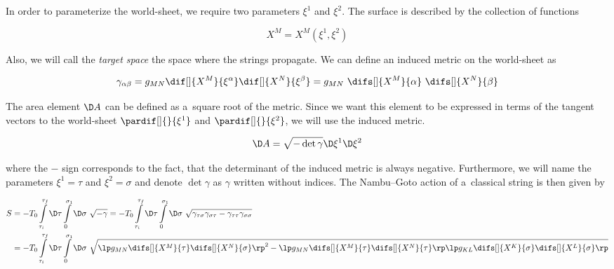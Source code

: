 In order to parameterize the world-sheet, we require two parameters $\xi^1$ and $\xi^2$. The surface is described by the collection of functions 

\begin{equation}
    X^M = X^M (\xi^1, \xi^2)
\end{equation}

\noindent
Also, we will call the \textit{target space} the space where the strings propagate. We can define an induced metric on the world-sheet as

\begin{equation}
\label{eq:gamma_def}
    \gamma_{\alpha \beta} = g_{MN} \dif[]{X^M}{\xi^\alpha} \dif[]{X^N}{\xi^\beta} = g_{MN} ~ \difs[]{X^M}{\alpha} ~ \difs[]{X^N}{\beta}
\end{equation}

\noindent
The area element $\D A$ can be defined as a~square root of the metric. Since we want this element to be expressed in terms of the tangent vectors to the world-sheet $\pardif[]{ }{\xi^1}$ and $\pardif[]{ }{\xi^2}$, we will use the induced metric.

\begin{equation}
    \D A = \sqrt{- \det{\gamma}} \D \xi^1 \D \xi^2
\end{equation}

\noindent
where the $-$ sign corresponds to the fact, that the determinant of the induced metric is always negative. Furthermore, we will name the parameters $\xi^1 = \tau$ and $\xi^2 = \sigma$ and denote $\det \gamma$ as $\gamma$ written without indices. The Nambu--Goto action of a~classical string is then given by

\begin{equation}
\label{eq:action}
    \begin{aligned}
        S &= -T_0 \int\limits_{\tau_i}^{\tau_f} \D \tau \int\limits_{0}^{\sigma_1} \D \sigma ~ \sqrt{- \gamma} =
        - T_0\int\limits_{\tau_i}^{\tau_f} \D \tau \int\limits_{0}^{\sigma_1} \D \sigma ~ \sqrt{\gamma_{\tau \sigma} \gamma_{\sigma \tau} - \gamma_{\tau \tau} \gamma_{\sigma \sigma} } \\
        &= - T_0\int\limits_{\tau_i}^{\tau_f} \D \tau \int\limits_{0}^{\sigma_1} \D \sigma ~ \sqrt{ \lp g_{MN} \difs[]{X^M}{\tau} \difs[]{X^N}{\sigma} \rp ^2 - \lp g_{MN} \difs[]{X^M}{\tau} \difs[]{X^N}{\tau} \rp \lp g_{KL} \difs[]{X^K}{\sigma} \difs[]{X^L}{\sigma} \rp  }
    \end{aligned}
\end{equation}


